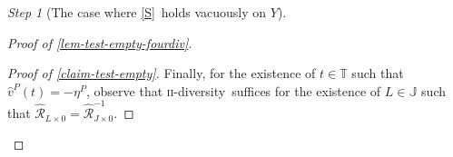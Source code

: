 \documentclass[ecta,nameyear,draft]{econsocart}
\newcommand{\R}{\mathbb R}
\newcommand{\novel}{\mathfrak f}
\newcommand{\hext}{\mathrel{\hat{\mathrel{\mathcal R}}}}
\newcommand{\aext}{\mathrel{\acute{\mathrel{\mathcal R}}}}
\newcommand{\aextb}{\mathbin{\acute{\mathbin{\mathcal R}}}}
\newcommand{\mbbc}{{\mathds C}}
\newcommand{\mbbt}{{\mathds {T}}}
\newcommand{\mbbj}{\mathds J}
\newcommand{\xy}{{(x, y)}}
\newcommand{\stability}{\ref{S}}
\newcommand{\twodiv}{\textsc{ii}-\textup{diversity}}
\theoremstyle{plain}
\theoremstyle{remark}
\newtheorem{step}{Step}[section]
\begin{document}
\begin{appendix}
\begin{step}[The case where \stability\ holds vacuously on $Y$]
\begin{proof}[Proof of \cref{lem-test-empty-fourdiv}]
\begin{proof}[Proof of \cref{claim-test-empty}]
        Finally, for the existence of $t\in\mbbt$ such that $\hat{v}^{P}(t) =
        -\eta^{P}$, observe that \twodiv\ suffices for the existence of $L \in
        \mbbj$ such that $\hext_{L\times 0} = \hext_{J\times 0}^{-1}$.
      \end{proof}


\end{proof}
\end{step}
\end{appendix}
\end{document}
